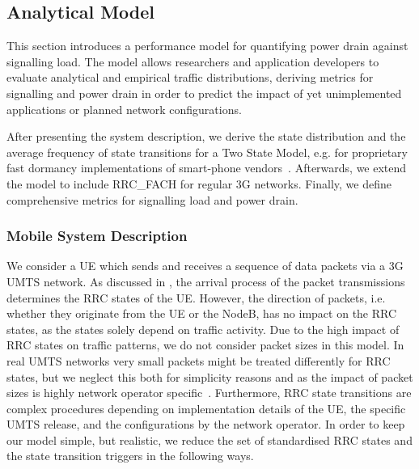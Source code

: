 \subsection{Analytical Model}\label{sec:network:performance_model:analytical_model}
This section introduces a performance model for quantifying power drain against signalling load.
The model allows researchers and application developers to evaluate analytical and empirical traffic distributions, deriving metrics for signalling and power drain in order to predict the impact of yet unimplemented applications or planned network configurations.

After presenting the system description, we derive the state distribution and the average frequency of state transitions for a Two State Model, e.g. for proprietary fast dormancy implementations of smart-phone vendors~\cite{NSN2011}.
Afterwards, we extend the model to include \gls{RRC_FACH} for regular \gls{3G} networks.
Finally, we define comprehensive metrics for signalling load and power drain.

\newcommand{\PacketIAT}{A\xspace}

\subsubsection*{Mobile  System Description}\label{sec:network:performance_model:analytical_model:system_description}
We consider a \gls{UE} which sends and receives a sequence of data packets via a \gls{3G} \gls{UMTS} network.
As discussed in , the arrival process of the packet transmissions determines the \gls{RRC} states of the \gls{UE}.
However, the direction of packets, i.e. whether they originate from the \gls{UE} or the NodeB, has no impact on the \gls{RRC} states, as the states solely depend on traffic activity.
Due to the high impact of \gls{RRC} states on traffic patterns, we do not consider packet sizes in this model.
In real \gls{UMTS} networks very small packets might be treated differently for \gls{RRC} states, but we neglect this both for simplicity reasons and as the impact of packet sizes is highly network operator specific~\cite{Qian2010a}.
Furthermore, \gls{RRC} state transitions are complex procedures depending on implementation details of the \gls{UE}, the specific \gls{UMTS} release, and the configurations by the network operator.
In order to keep our model simple, but realistic, we reduce the set of standardised \gls{RRC} states and the state transition triggers in the following ways.

